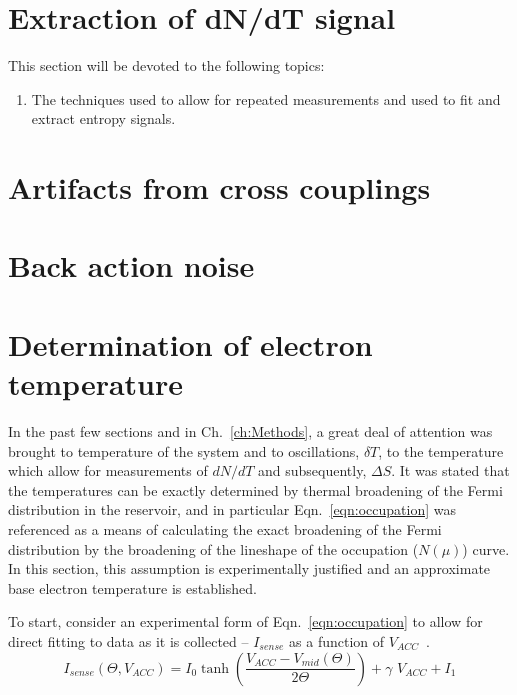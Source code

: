 \section{Extraction of dN/dT signal}
\label{sec:data_analysis}
This section will be devoted to the following topics:
\begin{enumerate}
	\item The techniques used to allow for repeated measurements and used to fit and extract entropy signals.
\end{enumerate}


\section{Artifacts from cross couplings}
\label{sec:artifacts}

\begin{figure}[h]
\centering
{}
\caption{}
\label{fig:dndt_artifact}       
\end{figure}

\section{Back action noise}
\label{sec:back}


\section{Determination of electron temperature}
\label{sec:electrontemp}

In the past few sections and in Ch.~\ref{ch:Methods}, a great deal of attention was brought to temperature of the system and to oscillations, $\delta T$, to the temperature which allow for measurements of $dN/dT$ and subsequently, $\Delta S$. It was stated that the temperatures can be exactly determined by thermal broadening of the Fermi distribution in the reservoir, and in particular Eqn.~\ref{eqn:occupation} was referenced as a means of calculating the exact broadening of the Fermi distribution by the broadening of the lineshape of the occupation ($N(\mu)$) curve. In this section, this assumption is experimentally justified and an approximate base electron temperature is established. 

To start, consider an experimental form of Eqn.~\ref{eqn:occupation} to allow for direct fitting to data as it is collected -- $I_{sense}$ as a function of $V_{ACC}$~\cite{nikentropy}.
\begin{equation}
	\label{eqn:exp_isense}
	 I_{sense}(\Theta, V_{ACC}) = I_0 \tanh\left(\frac{V_{ACC} - V_{mid}(\Theta)}{2\Theta}\right) + \gamma \,\, V_{ACC} + I_1
\end{equation}

